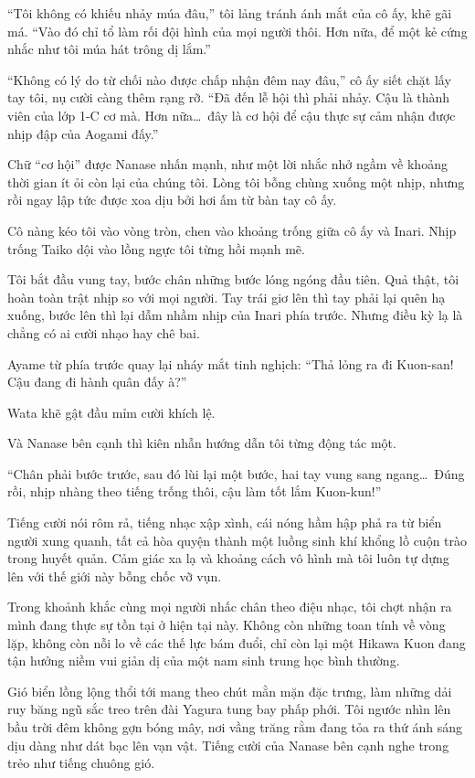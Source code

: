 \documentclass[../main.tex]{subfiles}
\begin{document}
``Tôi không có khiếu nhảy múa đâu,'' tôi lảng tránh ánh mắt của cô ấy, khẽ gãi má. ``Vào đó chỉ tổ làm rối đội hình của mọi người thôi. Hơn nữa, để một kẻ cứng nhắc như tôi múa hát trông dị lắm.''

``Không có lý do từ chối nào được chấp nhận đêm nay đâu,'' cô ấy siết chặt lấy tay tôi, nụ cười càng thêm rạng rỡ. ``Đã đến lễ hội thì phải nhảy. Cậu là thành viên của lớp 1-C cơ mà. Hơn nữa\dots\ đây là cơ hội để cậu thực sự cảm nhận được nhịp đập của Aogami đấy.''

Chữ ``cơ hội'' được Nanase nhấn mạnh, như một lời nhắc nhở ngầm về khoảng thời gian ít ỏi còn lại của chúng tôi. Lòng tôi bỗng chùng xuống một nhịp, nhưng rồi ngay lập tức được xoa dịu bởi hơi ấm từ bàn tay cô ấy.

Cô nàng kéo tôi vào vòng tròn, chen vào khoảng trống giữa cô ấy và Inari. Nhịp trống Taiko dội vào lồng ngực tôi từng hồi mạnh mẽ.

Tôi bắt đầu vung tay, bước chân những bước lóng ngóng đầu tiên. Quả thật, tôi hoàn toàn trật nhịp so với mọi người. Tay trái giơ lên thì tay phải lại quên hạ xuống, bước lên thì lại dẫm nhầm nhịp của Inari phía trước. Nhưng điều kỳ lạ là chẳng có ai cười nhạo hay chê bai.

Ayame từ phía trước quay lại nháy mắt tinh nghịch: ``Thả lỏng ra đi Kuon-san! Cậu đang đi hành quân đấy à?''

Wata khẽ gật đầu mỉm cười khích lệ.

Và Nanase bên cạnh thì kiên nhẫn hướng dẫn tôi từng động tác một.

``Chân phải bước trước, sau đó lùi lại một bước, hai tay vung sang ngang\dots\ Đúng rồi, nhịp nhàng theo tiếng trống thôi, cậu làm tốt lắm Kuon-kun!''

Tiếng cười nói rôm rả, tiếng nhạc xập xình, cái nóng hầm hập phả ra từ biển người xung quanh, tất cả hòa quyện thành một luồng sinh khí khổng lồ cuộn trào trong huyết quản. Cảm giác xa lạ và khoảng cách vô hình mà tôi luôn tự dựng lên với thế giới này bỗng chốc vỡ vụn.

Trong khoảnh khắc cùng mọi người nhấc chân theo điệu nhạc, tôi chợt nhận ra mình đang thực sự tồn tại ở hiện tại này. Không còn những toan tính về vòng lặp, không còn nỗi lo về các thế lực bám đuổi, chỉ còn lại một Hikawa Kuon đang tận hưởng niềm vui giản dị của một nam sinh trung học bình thường.

Gió biển lồng lộng thổi tới mang theo chút mằn mặn đặc trưng, làm những dải ruy băng ngũ sắc treo trên đài Yagura tung bay phấp phới. Tôi ngước nhìn lên bầu trời đêm không gợn bóng mây, nơi vầng trăng rằm đang tỏa ra thứ ánh sáng dịu dàng như dát bạc lên vạn vật. Tiếng cười của Nanase bên cạnh nghe trong trẻo như tiếng chuông gió.
\end{document}
